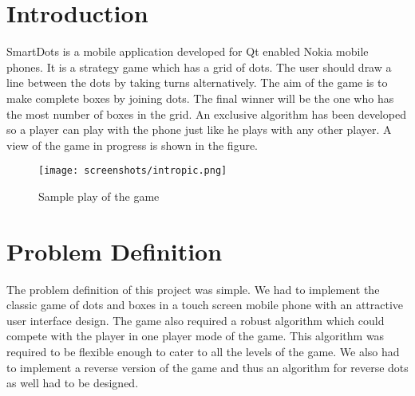 \documentclass[a4paper,12pt]{article}
\begin{document}
\section{Introduction}
\hspace{18pt}%
SmartDots is a mobile application developed for Qt enabled Nokia mobile phones. It is a strategy game which has a grid of dots. The user should draw a line between the dots by taking turns alternatively. The aim of the game is to make complete boxes by joining dots. The final winner will be the one who has the most number of boxes in the grid. An exclusive algorithm has been developed so a player can play with the phone just like he plays with any other player. A view of the game in progress is shown in the figure.
\begin{figure}[htp]
\centering
\texttt{[image: screenshots/intropic.png]}
\caption{Sample play of the game}
\end{figure}


\section{Problem Definition}
\hspace{18pt}%
The problem definition of this project was simple. We had to implement the classic game of dots and boxes in a touch screen mobile phone with an attractive user interface design. The game also required a robust algorithm which could compete with the player in one player mode of the game. This algorithm was required to be flexible enough to cater to all the levels of the game. We also had to implement a reverse version of the game and thus an algorithm for reverse dots as well had to be designed.
\end{document}
